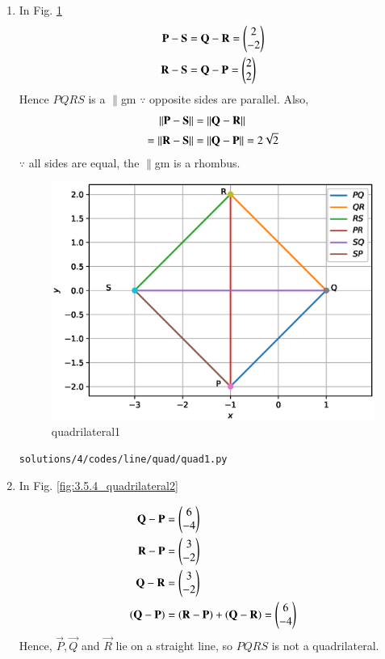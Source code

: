 \begin{enumerate}

\item In Fig. 	\ref{fig:3.5.4_quadrilateral1}
\begin{align}
 \mathbf{P} - \mathbf{S} &= 
 \mathbf{Q} - \mathbf{R} = \begin{pmatrix}2\\-2\end{pmatrix}
\\
\mathbf {R} - \mathbf {S} &=
 \mathbf {Q} - \mathbf {P} = \begin{pmatrix}2\\2\end{pmatrix}
\end{align}
%
Hence $PQRS$ is a $\parallel$gm $\because$  opposite sides are parallel. Also, 
\begin{align}
\left\lVert \mathbf{P} - \mathbf{S}\right\rVert &= 
\left\lVert \mathbf{Q} - \mathbf{R}\right\rVert 
\\
=\left\lVert\mathbf {R} - \mathbf {S}\right\rVert &=
\left\lVert \mathbf {Q} - \mathbf {P}\right\rVert = 2\sqrt{2}
\end{align}
%
$\because$ all sides are equal, the $\parallel$gm is a rhombus.

\begin{figure}[!ht]
	\centering
	\includegraphics[width=\columnwidth]{./solutions/4/figures/line/quads/quad1.eps}
	\caption{quadrilateral1 }
	\label{fig:3.5.4_quadrilateral1}
\end{figure}
\begin{lstlisting}
solutions/4/codes/line/quad/quad1.py
\end{lstlisting}

\item In Fig. 	\ref{fig:3.5.4_quadrilateral2}

\begin{align}
\mathbf{Q} - \mathbf{P} &= \begin{pmatrix}6\\-4\end{pmatrix}
\\
\mathbf{R} - \mathbf{P} &= \begin{pmatrix}3\\-2\end{pmatrix}
\\
\mathbf{Q} - \mathbf{R} &= \begin{pmatrix}3\\-2\end{pmatrix}
\\
\left(\mathbf{Q} - \mathbf{P}\right) &= \left(\mathbf{R} - \mathbf{P}\right) + \left(\mathbf{Q} - \mathbf{R}\right) = \begin{pmatrix}6\\-4\end{pmatrix}
\end{align}
Hence,  $\vec P,\vec Q$ and $\vec R$ lie on a straight line, so $PQRS$ is not  a quadrilateral.


\end{enumerate}

